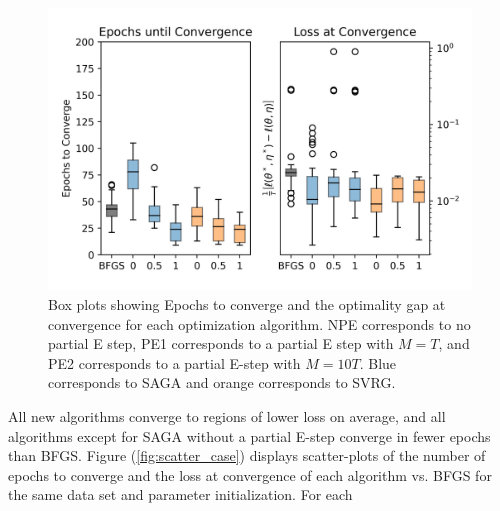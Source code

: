 \begin{figure}
    \centering
    \includegraphics[width=6.5in]{../plt/boxplots_case_study.png}
    \caption{Box plots showing Epochs to converge and the optimality gap at convergence for each optimization algorithm. NPE corresponds to no partial E step, PE1 corresponds to a partial E step with $M=T$, and PE2 corresponds to a partial E-step with $M=10T$. Blue corresponds to SAGA and orange corresponds to SVRG.}
    \label{fig:boxplots_case}
\end{figure}
%
All new algorithms converge to regions of lower loss on average, and all algorithms except for SAGA without a partial E-step converge in fewer epochs than BFGS.
%
Figure (\ref{fig:scatter_case}) displays scatter-plots of the number of epochs to converge and the loss at convergence of each algorithm vs. BFGS for the same data set and parameter initialization. For each 
%
